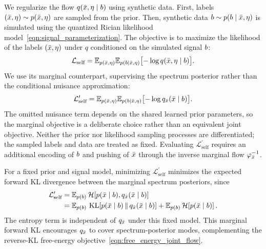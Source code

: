 We regularize the flow $q(\bar{x}, \eta \mid b)$ using synthetic data.
First, labels $(\bar{x}, \eta) \sim p(\bar{x}, \eta)$ are sampled from the prior.
Then, synthetic data $b \sim p(b \mid \bar{x}, \eta)$ is simulated using the quantized Rician likelihood model~\eqref{eqn:signal_parameterization}.
The objective is to maximize the likelihood of the labels $(\bar{x}, \eta)$ under $q$ conditioned on the simulated signal $b$:
\begin{align}\label{eqn:self_supervised_regularization}
    \mathcal{L}_{\text{self}} = \mathbb{E}_{p(\bar{x}, \eta)} \mathbb{E}_{p(b \mid \bar{x}, \eta)} \bigl[ -\log q(\bar{x}, \eta \mid b) \bigr].
\end{align}
We use its marginal counterpart, supervising the spectrum posterior rather than the conditional nuisance approximation:
\begin{align}\label{eqn:self_supervised_regularization_marginal}
    \mathcal{L}_{\text{self}}^{\prime} = \mathbb{E}_{p(\bar{x}, \eta)} \mathbb{E}_{p(b \mid \bar{x}, \eta)} \bigl[ -\log q_{\bar{x}}(\bar{x} \mid b) \bigr].
\end{align}
The omitted nuisance term depends on the shared learned prior parameters, so the marginal objective is a deliberate choice rather than an equivalent joint objective.
Neither the prior nor likelihood sampling processes are differentiated;
the sampled labels and data are treated as fixed.
Evaluating $\mathcal{L}_{\text{self}}^{\prime}$ requires an additional encoding of $b$ and pushing of $\bar{x}$ through the inverse marginal flow $\varphi_{\bar{x}}^{-1}$.

For a fixed prior and signal model, minimizing $\mathcal{L}_{\text{self}}^{\prime}$ minimizes the expected forward \gls*{KL} divergence between the marginal spectrum posteriors, since
\begin{align*}
    \mathcal{L}_{\text{self}}^{\prime} & = \mathbb{E}_{p(b)} \, \mathcal{H}\!\left[p(\bar{x} \mid b),q_{\bar{x}}(\bar{x} \mid b)\right] \\
                                       & = \mathbb{E}_{p(b)} \, \operatorname{KL}\!\left[p(\bar{x} \mid b) \,\|\, q_{\bar{x}}(\bar{x} \mid b)\right]
    + \mathbb{E}_{p(b)} \, \mathcal{H}\!\left[p(\bar{x} \mid b)\right].
\end{align*}
The entropy term is independent of $q_{\bar{x}}$ under this fixed model.
This marginal forward \gls*{KL} encourages $q_{\bar{x}}$ to cover spectrum-posterior modes, complementing the reverse-\gls*{KL} free-energy objective~\eqref{eqn:free_energy_joint_flow}.

